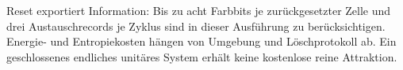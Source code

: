 Reset exportiert Information: Bis zu acht Farbbits je zurückgesetzter Zelle und drei Austauschrecords je Zyklus sind in dieser Ausführung zu berücksichtigen. Energie- und Entropiekosten hängen von Umgebung und Löschprotokoll ab. Ein geschlossenes endliches unitäres System erhält keine kostenlose reine Attraktion.
